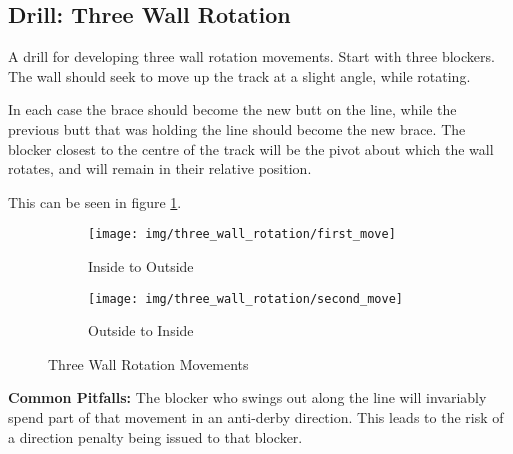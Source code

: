 \subsection*{Drill: Three Wall Rotation} 
\label{drill:three_wall/rotation}

A drill for developing three wall rotation movements.
Start with three blockers. The wall should seek to move up the track at a slight angle, while rotating. 

In each case the brace should become the new butt on the line, while the previous butt that was holding the line should become the new brace.
The blocker closest to the centre of the track will be the pivot about which the wall rotates, and will remain in their relative position.

This can be seen in figure \ref{fig:three_wall_rotation}.

\begin{figure}[h]
\begin{subfigure}{0.49\linewidth}
\centering
\texttt{[image: img/three\_wall\_rotation/first\_move]}
\caption{Inside to Outside}
\end{subfigure}
\begin{subfigure}{0.49\linewidth}
\centering
\texttt{[image: img/three\_wall\_rotation/second\_move]}
\caption{Outside to Inside}
\end{subfigure}
\caption{Three Wall Rotation Movements\label{fig:three_wall_rotation}}
\end{figure}

{\bf Common Pitfalls:}
The blocker who swings out along the line will invariably spend part of that movement in an anti-derby direction.  
This leads to the risk of a direction penalty being issued to that blocker.
